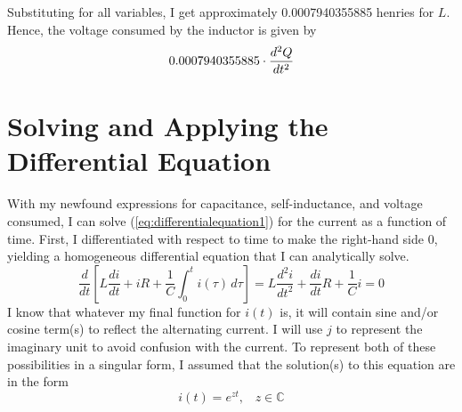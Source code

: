 \documentclass[12pt]{article}
\numberwithin{equation}{section}
\begin{document}
Substituting for all variables, I get approximately 0.0007940355885 henries for $L$. Hence, the voltage consumed by the inductor is given by
\begin{equation}{\label{eq:voltageinductor}}
    0.0007940355885 \cdot \frac{d^2Q}{dt^2}
\end{equation}
\FloatBarrier
\section{Solving and Applying the Differential Equation}
With my newfound expressions for capacitance, self-inductance, and voltage consumed, I can solve (\ref{eq:differentialequation1}) for the current as a function of time. First, I differentiated with respect to time to make the right-hand side 0, yielding a homogeneous differential equation that I can analytically solve.
\begin{equation}\label{eq:finaldiffeq}
  \frac{d}{dt} \left[ L \frac{di}{dt} + iR+ \frac{1}{C} \int_{0}^{t} i(\tau) \, d\tau \right] =  L \frac{d^2i}{dt^2} + \frac{di}{dt}R+ \frac{1}{C}i = 0
\end{equation}
I know that whatever my final function for $i(t)$ is, it will contain sine and/or cosine term(s) to reflect the alternating current.  I will use $j$ to represent the imaginary unit to avoid confusion with the current. To represent both of these possibilities in a singular form, I assumed that the solution(s) to this equation are in the form 
$$i(t) = e^{zt}, \hspace{10pt} z \in \mathbb{C}$$ 
\end{document}
